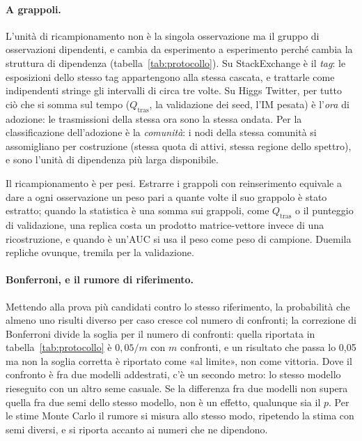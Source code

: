 \documentclass[11pt,a4paper]{article}
\newcommand{\Qtras}{Q_{\mathrm{tras}}}
\newcommand{\sx}{StackExchange}
\newcommand{\hg}{Higgs Twitter}
\begin{document}
\paragraph{A grappoli.} L'unità di ricampionamento non è la singola osservazione ma il gruppo di osservazioni dipendenti, e cambia da esperimento a esperimento perché cambia la struttura di dipendenza (tabella~\ref{tab:protocollo}). Su \sx{} è il \emph{tag}: le esposizioni dello stesso tag appartengono alla stessa cascata, e trattarle come indipendenti stringe gli intervalli di circa tre volte. Su \hg{}, per tutto ciò che si somma sul tempo ($\Qtras$, la validazione dei seed, l'IM pesata) è l'\emph{ora} di adozione: le trasmissioni della stessa ora sono la stessa ondata. Per la classificazione dell'adozione è la \emph{comunità}: i nodi della stessa comunità si assomigliano per costruzione (stessa quota di attivi, stessa regione dello spettro), e sono l'unità di dipendenza più larga disponibile.

Il ricampionamento è per pesi. Estrarre i grappoli con reinserimento equivale a dare a ogni osservazione un peso pari a quante volte il suo grappolo è stato estratto; quando la statistica è una somma sui grappoli, come $\Qtras$ o il punteggio di validazione, una replica costa un prodotto matrice-vettore invece di una ricostruzione, e quando è un'AUC si usa il peso come peso di campione. Duemila repliche ovunque, tremila per la validazione.

\paragraph{Bonferroni, e il rumore di riferimento.} Mettendo alla prova più candidati contro lo stesso riferimento, la probabilità che almeno uno risulti diverso per caso cresce col numero di confronti; la correzione di Bonferroni \citep{dunn1961} divide la soglia per il numero di confronti: quella riportata in tabella~\ref{tab:protocollo} è $0{,}05/m$ con $m$ confronti, e un risultato che passa lo 0,05 ma non la soglia corretta è riportato come «al limite», non come vittoria. Dove il confronto è fra due modelli addestrati, c'è un secondo metro: lo stesso modello rieseguito con un altro seme casuale. Se la differenza fra due modelli non supera quella fra due semi dello stesso modello, non è un effetto, qualunque sia il $p$. Per le stime Monte Carlo il rumore si misura allo stesso modo, ripetendo la stima con semi diversi, e si riporta accanto ai numeri che ne dipendono.
\end{document}
